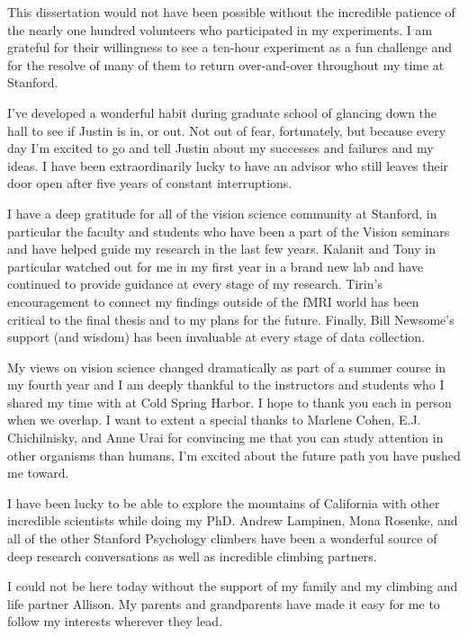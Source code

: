This dissertation would not have been possible without the incredible patience of the nearly one hundred volunteers who participated in my experiments. I am grateful for their willingness to see a ten-hour experiment as a fun challenge and for the resolve of many of them to return over-and-over throughout my time at Stanford.

I've developed a wonderful habit during graduate school of glancing down the hall to see if Justin is in, or out. Not out of fear, fortunately, but because every day I'm excited to go and tell Justin about my successes and failures and my ideas. I have been extraordinarily lucky to have an advisor who still leaves their door open after five years of constant interruptions.

I have a deep gratitude for all of the vision science community at Stanford, in particular the faculty and students who have been a part of the Vision seminars and have helped guide my research in the last few years. Kalanit and Tony in particular watched out for me in my first year in a brand new lab and have continued to provide guidance at every stage of my research. Tirin's encouragement to connect my findings outside of the fMRI world has been critical to the final thesis and to my plans for the future. Finally, Bill Newsome's support (and wisdom) has been invaluable at every stage of data collection.

My views on vision science changed dramatically as part of a summer course in my fourth year and I am deeply thankful to the instructors and students who I shared my time with at Cold Spring Harbor. I hope to thank you each in person when we overlap. I want to extent a special thanks to Marlene Cohen, E.J. Chichilnisky, and Anne Urai for convincing me that you can study attention in other organisms than humans, I'm excited about the future path you have pushed me toward.

I have been lucky to be able to explore the mountains of California with other incredible scientists while doing my PhD. Andrew Lampinen, Mona Rosenke, and all of the other Stanford Psychology climbers have been a wonderful source of deep research conversations as well as incredible climbing partners.

I could not be here today without the support of my family and my climbing and life partner Allison. My parents and grandparents have made it easy for me to follow my interests wherever they lead.